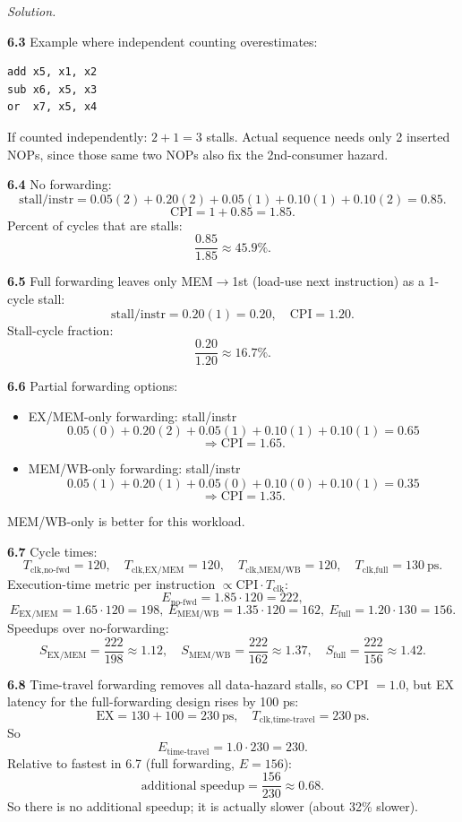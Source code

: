 \documentclass[12pt]{article}
\newenvironment{solution}{\par\noindent\textit{Solution.}\ }{\par\vspace{1.1em}}
\newcommand{\subproblem}[1]{\par\vspace{0.45em}\noindent\textbf{#1}\quad}
\begin{document}
\begin{solution}
\subproblem{6.3}
Example where independent counting overestimates:
\begin{verbatim}
add x5, x1, x2
sub x6, x5, x3
or  x7, x5, x4
\end{verbatim}
If counted independently: $2+1=3$ stalls. Actual sequence needs only 2 inserted NOPs, since those same two NOPs also fix the 2nd-consumer hazard.

\subproblem{6.4}
No forwarding:
\[
\text{stall/instr}=0.05(2)+0.20(2)+0.05(1)+0.10(1)+0.10(2)=0.85.
\]
\[
\text{CPI}=1+0.85=1.85.
\]
Percent of cycles that are stalls:
\[
\frac{0.85}{1.85}\approx 45.9\%.
\]

\subproblem{6.5}
Full forwarding leaves only MEM$\rightarrow$1st (load-use next instruction) as a 1-cycle stall:
\[
\text{stall/instr}=0.20(1)=0.20,\quad \text{CPI}=1.20.
\]
Stall-cycle fraction:
\[
\frac{0.20}{1.20}\approx 16.7\%.
\]

\subproblem{6.6}
Partial forwarding options:
\begin{itemize}
\item EX/MEM-only forwarding: stall/instr
\[
0.05(0)+0.20(2)+0.05(1)+0.10(1)+0.10(1)=0.65
\]
\[
\Rightarrow \text{CPI}=1.65.
\]
\item MEM/WB-only forwarding: stall/instr
\[
0.05(1)+0.20(1)+0.05(0)+0.10(0)+0.10(1)=0.35
\]
\[
\Rightarrow \text{CPI}=1.35.
\]
\end{itemize}
MEM/WB-only is better for this workload.

\subproblem{6.7}
Cycle times:
\[
T_{\text{clk,no-fwd}}=120,\quad T_{\text{clk,EX/MEM}}=120,\quad
T_{\text{clk,MEM/WB}}=120,\quad T_{\text{clk,full}}=130\ \text{ps}.
\]
Execution-time metric per instruction $\propto \text{CPI}\cdot T_{\text{clk}}$:
\[
E_{\text{no-fwd}}=1.85\cdot120=222,
\]
\[
E_{\text{EX/MEM}}=1.65\cdot120=198,\ 
E_{\text{MEM/WB}}=1.35\cdot120=162,\ 
E_{\text{full}}=1.20\cdot130=156.
\]
Speedups over no-forwarding:
\[
S_{\text{EX/MEM}}=\frac{222}{198}\approx 1.12,\quad
S_{\text{MEM/WB}}=\frac{222}{162}\approx 1.37,\quad
S_{\text{full}}=\frac{222}{156}\approx 1.42.
\]

\subproblem{6.8}
Time-travel forwarding removes all data-hazard stalls, so CPI $=1.0$, but EX latency for the full-forwarding design rises by 100 ps:
\[
\text{EX}=130+100=230\ \text{ps},\quad T_{\text{clk,time-travel}}=230\ \text{ps}.
\]
So
\[
E_{\text{time-travel}}=1.0\cdot 230=230.
\]
Relative to fastest in 6.7 (full forwarding, $E=156$):
\[
\text{additional speedup}=\frac{156}{230}\approx 0.68.
\]
So there is no additional speedup; it is actually slower (about 32\% slower).
\end{solution}
\end{document}
